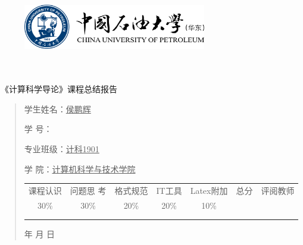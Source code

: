 \documentclass{article}
\renewcommand{\today}{\number\year 年 \number\month 月 \number\day 日}
\begin{document}
\begin{figure}
    \centering
    \includegraphics[width=8cm]{upc.png}

    \label{figupc}
\end{figure}

	\begin{center}
		\quad \\
		\quad \\
		\heiti \fontsize{45}{17} \quad \quad \quad 
		\vskip 1.5cm
		\heiti {} 《计算科学导论》课程总结报告
	\end{center}
	\vskip 2.0cm
		
	\begin{quotation}
		\doublespacing
		
        \par\setlength\parindent{7em}
		\quad 

		学生姓名：\underline{\qquad  侯鹏辉 \qquad \qquad}

		学\hspace{0.61cm} 号：\underline{\qquad}
		
		专业班级：\underline{\qquad 计科1901 \qquad  }
		
        学\hspace{0.61cm} 院：\underline{计算机科学与技术学院}
		\vskip 2cm
		\centering
		\begin{table}[h]
            \centering 
            \begin{tabular}{|c|c|c|c|c|c|c|}
                \hline
                课程认识 & 问题思 考 & 格式规范  & IT工具  & Latex附加  & 总分 & 评阅教师 \\
                30\% & 30\% & 20\% & 20\% & 10\% &  &  \\
                \hline
                 & & & & & &\\
                & & & & & &\\
                \hline
            \end{tabular}
        \end{table}
		\vskip 2cm
		\today
	\end{quotation}
\end{document}
